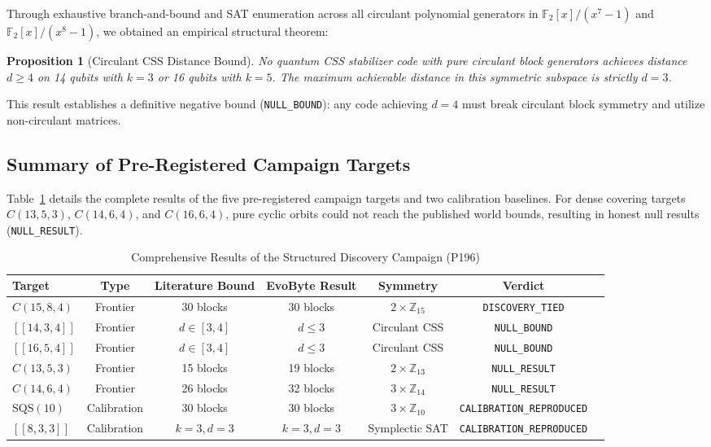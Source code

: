 \documentclass[11pt,a4paper]{article}
\newtheorem{proposition}[theorem]{Proposition}
\begin{document}
Through exhaustive branch-and-bound and SAT enumeration across all circulant polynomial generators in $\mathbb{F}_2[x]/(x^7 - 1)$ and $\mathbb{F}_2[x]/(x^8 - 1)$, we obtained an empirical structural theorem:
\begin{proposition}[Circulant CSS Distance Bound]
\label{prop:circulant_bound}
No quantum CSS stabilizer code with pure circulant block generators achieves distance $d \ge 4$ on 14 qubits with $k=3$ or 16 qubits with $k=5$. The maximum achievable distance in this symmetric subspace is strictly $d = 3$.
\end{proposition}
This result establishes a definitive negative bound (\texttt{NULL\_BOUND}): any code achieving $d=4$ must break circulant block symmetry and utilize non-circulant matrices.

\subsection{Summary of Pre-Registered Campaign Targets}
\label{sec:campaign_summary}
Table~\ref{tab:campaign} details the complete results of the five pre-registered campaign targets and two calibration baselines. For dense covering targets $C(13, 5, 3)$, $C(14, 6, 4)$, and $C(16, 6, 4)$, pure cyclic orbits could not reach the published world bounds, resulting in honest null results (\texttt{NULL\_RESULT}).

\begin{table}[t]
\centering
\caption{Comprehensive Results of the Structured Discovery Campaign (P196)}
\label{tab:campaign}
\begin{tabular}{lcccccc}
\toprule
\textbf{Target} & \textbf{Type} & \textbf{Literature Bound} & \textbf{EvoByte Result} & \textbf{Symmetry} & \textbf{Verdict} \\
\midrule
$C(15, 8, 4)$ & Frontier & 30 blocks \cite{gordon2026ljcr} & 30 blocks & $2 \times \mathbb{Z}_{15}$ & \texttt{DISCOVERY\_TIED} \\
$[[14, 3, 4]]$ & Frontier & $d \in [3, 4]$ \cite{grassl2026codetables} & $d \le 3$ & Circulant CSS & \texttt{NULL\_BOUND} \\
$[[16, 5, 4]]$ & Frontier & $d \in [3, 4]$ \cite{grassl2026codetables} & $d \le 3$ & Circulant CSS & \texttt{NULL\_BOUND} \\
$C(13, 5, 3)$ & Frontier & 15 blocks \cite{gordon2026ljcr} & 19 blocks & $2 \times \mathbb{Z}_{13}$ & \texttt{NULL\_RESULT} \\
$C(14, 6, 4)$ & Frontier & 26 blocks \cite{gordon2026ljcr} & 32 blocks & $3 \times \mathbb{Z}_{14}$ & \texttt{NULL\_RESULT} \\
\midrule
$\text{SQS}(10)$ & Calibration & 30 blocks \cite{mills1979sqs} & 30 blocks & $3 \times \mathbb{Z}_{10}$ & \texttt{CALIBRATION\_REPRODUCED} \\
$[[8, 3, 3]]$ & Calibration & $k=3, d=3$ \cite{gottesman1996stabilizer} & $k=3, d=3$ & Symplectic SAT & \texttt{CALIBRATION\_REPRODUCED} \\
\bottomrule
\end{tabular}
\end{table}
\end{document}
